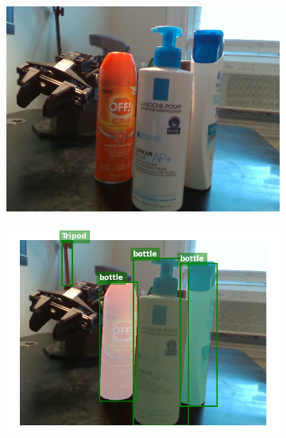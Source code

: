 \documentclass{article}
\begin{document}
\begin{figure}[]
    \begin{subfigure}{(\linewidth - 0.05\linewidth)/5}
        \centering
        \includegraphics[width=\linewidth]{figures/real2sim2real/8/1.png}
        \caption{}
    \end{subfigure}
    \begin{subfigure}{(\linewidth - 0.05\linewidth)/5}
        \centering
        \includegraphics[width=\linewidth]{figures/real2sim2real/8/0.png}
        \caption{}
    \end{subfigure}
    \begin{subfigure}{(\linewidth - 0.05\linewidth)/5}
        \centering

\end{subfigure}
\end{figure}
\end{document}

